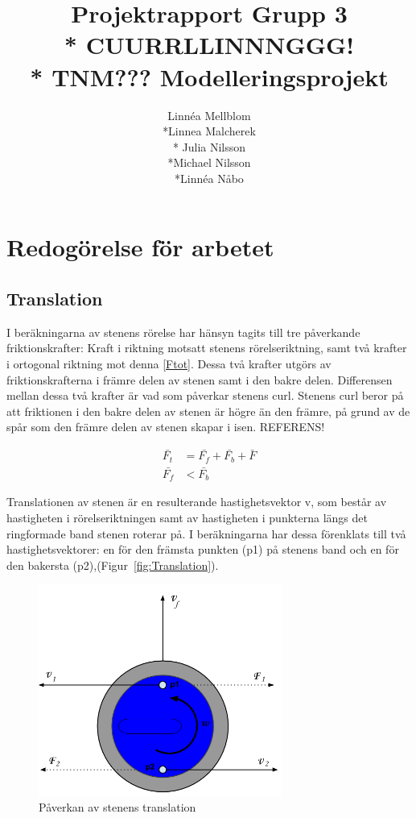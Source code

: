 \documentclass[11pt]{article} %
\title{Projektrapport Grupp 3 \\* 
CUURRLLINNNGGG!\\*
TNM??? Modelleringsprojekt}
\author{Linnéa Mellblom\\*Linnea Malcherek\\* Julia Nilsson\\*Michael Nilsson\\*Linnéa Nåbo}
\begin{document}
\maketitle
\pagebreak
{}  

\section{Redogörelse för arbetet}

\subsection{Translation}

I beräkningarna av stenens rörelse har hänsyn tagits till tre påverkande friktionskrafter: Kraft i riktning motsatt stenens rörelseriktning, samt två krafter i ortogonal riktning mot denna \eqref{Ftot}. Dessa två krafter utgörs av friktionskrafterna i främre delen av stenen samt i den bakre delen. Differensen mellan dessa två krafter är vad som påverkar stenens curl. 
Stenens curl beror på att friktionen i den bakre delen av stenen är högre än den främre, på grund av de spår som den främre delen av stenen skapar i isen. REFERENS! 

 \begin{align}\label{Ftot}
 \bar{F_t}&=\bar{F_f}+\bar{F_b}+\bar{F}\\
 \bar{F_f}&<\bar{F_b}
 \end{align}

Translationen av stenen är en resulterande hastighetsvektor v, som består av hastigheten i rörelseriktningen samt av hastigheten i punkterna längs det ringformade band stenen roterar på. I beräkningarna har dessa förenklats till två hastighetsvektorer: en för den främsta punkten (p1)  på stenens band och en för den bakersta (p2),(Figur~\ref{fig:Translation}). 

\begin{figure}[ht!]
\centering
\includegraphics[width=80mm]{Translation.png}
\caption{Påverkan av stenens translation}
\label{fig:Translation}
\label{overflow}
\end{figure}
\end{document}
